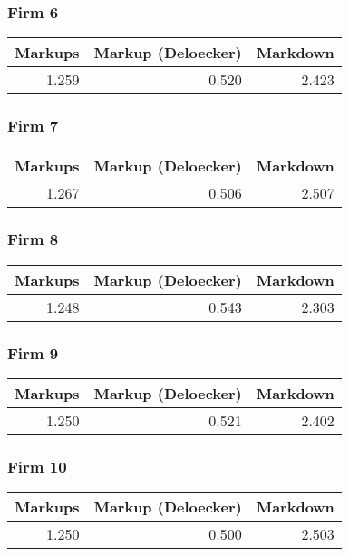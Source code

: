 \subsubsection*{Firm 6}
\begin{tabular}{rrr}
\toprule
 Markups &  Markup (Deloecker) &  Markdown \\
\midrule
   1.259 &               0.520 &     2.423 \\
\bottomrule
\end{tabular}


\subsubsection*{Firm 7}
\begin{tabular}{rrr}
\toprule
 Markups &  Markup (Deloecker) &  Markdown \\
\midrule
   1.267 &               0.506 &     2.507 \\
\bottomrule
\end{tabular}


\subsubsection*{Firm 8}
\begin{tabular}{rrr}
\toprule
 Markups &  Markup (Deloecker) &  Markdown \\
\midrule
   1.248 &               0.543 &     2.303 \\
\bottomrule
\end{tabular}


\subsubsection*{Firm 9}
\begin{tabular}{rrr}
\toprule
 Markups &  Markup (Deloecker) &  Markdown \\
\midrule
   1.250 &               0.521 &     2.402 \\
\bottomrule
\end{tabular}


\subsubsection*{Firm 10}
\begin{tabular}{rrr}
\toprule
 Markups &  Markup (Deloecker) &  Markdown \\
\midrule
   1.250 &               0.500 &     2.503 \\
\bottomrule
\end{tabular}


